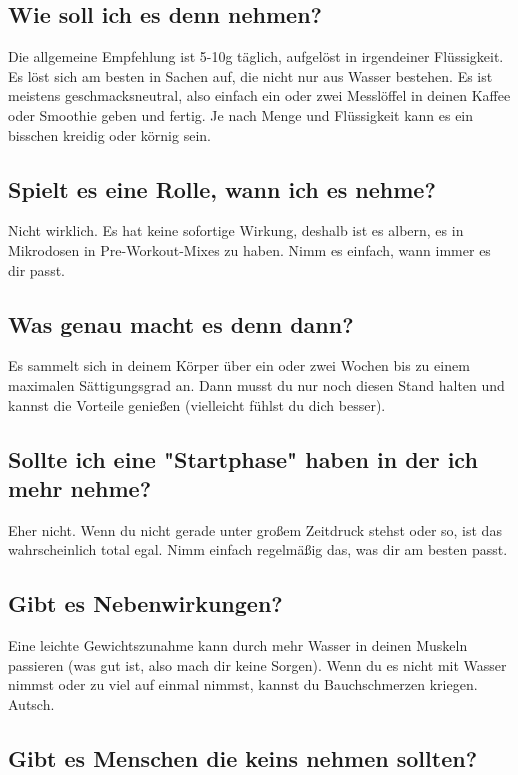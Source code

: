 \documentclass{article}
\begin{document}
\subsection{Wie soll ich es denn nehmen?}

Die allgemeine Empfehlung ist 5-10g täglich, aufgelöst in irgendeiner Flüssigkeit. Es löst sich am besten in Sachen auf, die nicht nur aus Wasser bestehen. Es ist meistens geschmacksneutral, also einfach ein oder zwei Messlöffel in deinen Kaffee oder Smoothie geben und fertig. Je nach Menge und Flüssigkeit kann es ein bisschen kreidig oder körnig sein.

\subsection{Spielt es eine Rolle, wann ich es nehme?}

Nicht wirklich. Es hat keine sofortige Wirkung, deshalb ist es albern, es in Mikrodosen in Pre-Workout-Mixes zu haben. Nimm es einfach, wann immer es dir passt.

\subsection{Was genau macht es denn dann?}

Es sammelt sich in deinem Körper über ein oder zwei Wochen bis zu einem maximalen Sättigungsgrad an. Dann musst du nur noch diesen Stand halten und kannst die Vorteile genießen (vielleicht fühlst du dich besser).

\subsection{Sollte ich eine "Startphase" haben in der ich mehr nehme?}

Eher nicht. Wenn du nicht gerade unter großem Zeitdruck stehst oder so, ist das wahrscheinlich total egal. Nimm einfach regelmäßig das, was dir am besten passt.

\subsection{Gibt es Nebenwirkungen?}

Eine leichte Gewichtszunahme kann durch mehr Wasser in deinen Muskeln passieren (was gut ist, also mach dir keine Sorgen). Wenn du es nicht mit Wasser nimmst oder zu viel auf einmal nimmst, kannst du Bauchschmerzen kriegen. Autsch.

\subsection{Gibt es Menschen die keins nehmen sollten?}
\end{document}
